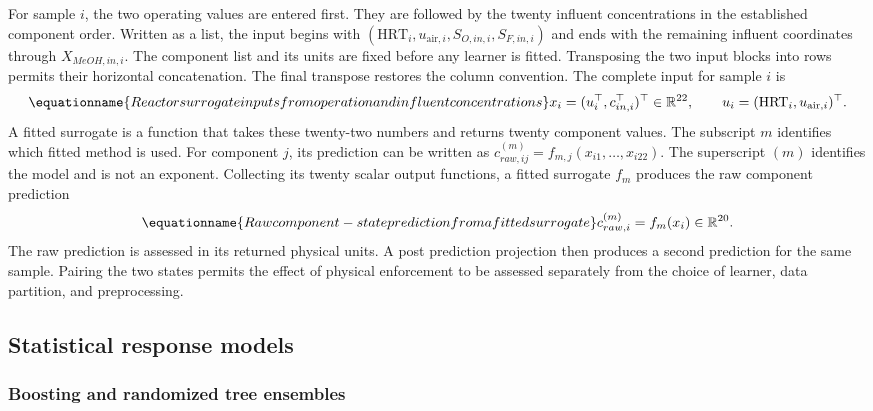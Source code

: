 For sample $i$, the two operating values are entered first. They are followed by the twenty influent concentrations in the established component order. Written as a list, the input begins with $(\mathrm{HRT}_i,u_{\mathrm{air},i},S_{O,in,i},S_{F,in,i})$ and ends with the remaining influent coordinates through $X_{MeOH,in,i}$. The component list and its units are fixed before any learner is fitted. Transposing the two input blocks into rows permits their horizontal concatenation. The final transpose restores the column convention. The complete input for sample $i$ is
\begin{equation}
\equationname{Reactor surrogate inputs from operation and influent concentrations}
x_i=(u_i^\top,c_{in,i}^\top)^\top\in\mathbb{R}^{22},\qquad
u_i=(\mathrm{HRT}_i,u_{\mathrm{air},i})^\top.
\label{eq:surrogate_input_vector}
\end{equation}
A fitted surrogate is a function that takes these twenty-two numbers and returns twenty component values. The subscript $m$ identifies which fitted method is used. For component $j$, its prediction can be written as $c_{raw,ij}^{(m)}=f_{m,j}(x_{i1},\ldots,x_{i22})$. The superscript $(m)$ identifies the model and is not an exponent. Collecting its twenty scalar output functions, a fitted surrogate $f_m$ produces the raw component prediction
\begin{equation}
\equationname{Raw component-state prediction from a fitted surrogate}
c_{raw,i}^{(m)}=f_m(x_i)\in\mathbb{R}^{20}.
\label{eq:surrogate_raw_state}
\end{equation}
The raw prediction is assessed in its returned physical units. A post prediction projection then produces a second prediction for the same sample. Pairing the two states permits the effect of physical enforcement to be assessed separately from the choice of learner, data partition, and preprocessing.

\subsection{Statistical response models}

\subsubsection{Boosting and randomized tree ensembles}


